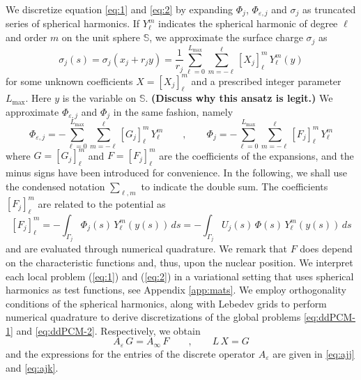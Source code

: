 We discretize equation \eqref{eq:1} and \eqref{eq:2} by expanding $\Phi_j$, $\Phi_{\varepsilon,j}$ and $\sigma_j$ as truncated series of spherical harmonics. If $Y_\ell^m$ indicates the spherical harmonic of degree $\ell$ and order $m$ on the unit sphere $\mathbb{S}$, we approximate the surface charge $\sigma_j$ as
\[
\sigma_j(s) = \sigma_j(x_j + r_j y) = \frac{1}{r_j}\sum_{\ell=0}^{L_\text{max}} \sum_{m = -\ell}^\ell [X_j]_\ell^m \, Y_\ell^m(y)
\]
for some unknown coefficients $X = [X_j]_\ell^m$ and a prescribed integer parameter ${L_\text{max}}$. Here $y$ is the variable on $\mathbb{S}$. {\bf (Discuss why this ansatz is legit.)} We approximate $\Phi_{\varepsilon,j}$ and $\Phi_j$ in the same fashion, namely
\[
\Phi_{\varepsilon,j} = - \sum_{\ell=0}^{L_\text{max}} \sum_{m = -\ell}^\ell [G_j]_\ell^m \, Y_\ell^m \qquad , \qquad \Phi_j = -\sum_{\ell=0}^{L_\text{max}} \sum_{m = -\ell}^\ell [F_j]_\ell^m \, Y_\ell^m
\]
where $G = [G_j]_\ell^m$ and $F = [F_j]_\ell^m$ are the coefficients of the expansions, and the minus signs have been introduced for convenience. In the following, we shall use the condensed notation $\sum_{\ell ,m}$ to indicate the double sum. The coefficients $[F_j]_\ell^m$ are related to the potential as
\begin{equation}\label{eq:25}
[F_j]_\ell^m = - \int_{\Gamma_j} \Phi_j(s) \, Y_\ell^m(y(s)) \,ds = - \int_{\Gamma_j} U_j(s) \, \Phi(s) \, Y_\ell^m(y(s)) \,ds
\end{equation}
and are evaluated through numerical quadrature. We remark that $F$ does depend on the characteristic functions and, thus, upon the nuclear position. We interpret each local problem (\ref{eq:1}) and (\ref{eq:2}) in a variational setting that uses spherical harmonics as test functions, see Appendix \ref{app:mats}. We employ orthogonality conditions of the spherical harmonics, along with Lebedev grids to perform numerical quadrature to derive discretizations of the global problems \eqref{eq:ddPCM-1} and \eqref{eq:ddPCM-2}. Respectively, we obtain
\begin{equation}\label{eq:6}
A_\varepsilon \, G = A_\infty \, F \qquad , \qquad  L \, X = G
\end{equation}
and the expressions for the entries of the discrete operator $A_\varepsilon$ are given in \eqref{eq:ajj} and \eqref{eq:ajk}.


